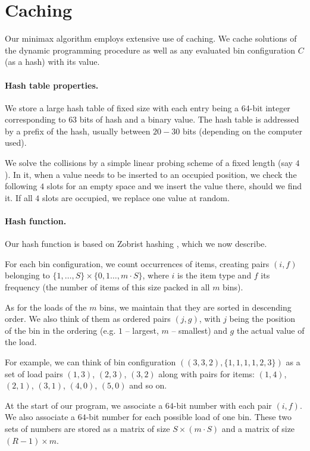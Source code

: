 \section{Caching}\label{sec:4:caching}

Our minimax algorithm employs extensive use of caching. We cache
solutions of the dynamic programming procedure \MaxFeas as well as any
evaluated bin configuration $C$ (as a hash) with its value.

\paragraph{Hash table properties.} We store a large hash table of
fixed size with each entry being a 64-bit integer corresponding to
$63$ bits of hash and a binary value. The hash table is addressed
by a prefix of the hash, usually between $20-30$ bits (depending
on the computer used).

We solve the collisions by a simple linear probing scheme of a fixed
length (say $4$). In it, when a value needs to be inserted to an
occupied position, we check the following $4$ slots for an empty space
and we insert the value there, should we find it. If all $4$ slots are
occupied, we replace one value at random.

\paragraph{Hash function.} Our hash function is based on Zobrist
hashing \cite{zobrist}, which we now describe.

For each bin configuration, we count occurrences of items, creating
pairs $(i,f)$ belonging to $\{1,\ldots,S\} \times \{0,1\ldots,m\cdot
S\}$, where $i$ is the item type and $f$ its frequency (the number of
items of this size packed in all $m$ bins).

As for the loads of the $m$ bins, we maintain that they are sorted in
descending order. We also think of them as ordered pairs $(j,g)$, with
$j$ being the position of the bin in the ordering (e.g. $1$ --
largest, $m$ -- smallest) and $g$ the actual value of the load.

For example, we can think of bin configuration
$((3,3,2),\{1,1,1,1,2,3\})$ as a set of load pairs $(1,3)$, $(2,3)$,
$(3,2)$ along with pairs for items: $(1,4)$, $(2,1)$, $(3,1)$,
$(4,0)$, $(5,0)$ and so on.

At the start of our program, we associate a $64$-bit number with each
pair $(i,f)$. We also associate a $64$-bit number for each possible
load of one bin. These two sets of numbers are stored as a matrix of
size $S \times (m\cdot S)$ and a matrix of size $(R-1) \times m$.

